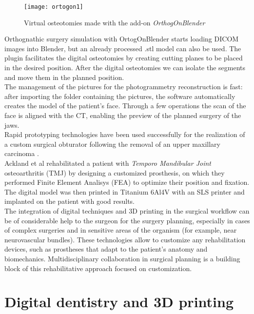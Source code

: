 \begin{figure}[h]
\vspace{-10pt}
	\begin{center}
	\texttt{[image: ortogon1]}
    \caption{Virtual osteotomies made with the add-on \emph{OrthogOnBlender}}
    \label{fig:ortogon1}
    \end{center}
\vspace{-20pt}
\end{figure}


Orthognathic surgery simulation with OrtogOnBlender \parencite{Reference80} starts loading DICOM images into Blender, but an already processed .stl model can also be used. The plugin facilitates the digital osteotomies by creating cutting planes to be placed in the desired position. After the digital osteotomies we can isolate the segments and move them in the planned position. \\
The management of the pictures for the photogrammetry reconstruction is fast: after importing the folder containing the pictures, the software automatically creates the model of the patient's face. Through a few operations the scan of the face is aligned with the CT, enabling the preview of the planned surgery of the jaws.\\
Rapid prototyping technologies have been used successfully for the realization of a custom surgical obturator following the removal of an upper maxillary carcinoma \parencite{Reference81}. \\
Ackland et al \parencite{Reference82} rehabilitated a patient with \emph{Temporo Mandibular Joint} osteoarthritis (TMJ) by designing a customized prosthesis, on which they performed Finite Element Analisys (FEA) to optimize their position and fixation. The digital model was then printed in Titanium 6Al4V with an SLS printer and implanted on the patient with good results. \\
The integration of digital techniques and 3D printing in the surgical workflow can be of considerable help to the surgeon for the surgery planning, especially in cases of complex surgeries and in sensitive areas of the organism (for example, near neurovascular bundles). These technologies allow to customize any rehabilitation devices, such as prostheses that adapt to the patient's anatomy and biomechanics. Multidisciplinary collaboration in surgical planning is a building block of this rehabilitative approach focused on customization.


\section{Digital dentistry and 3D printing}

